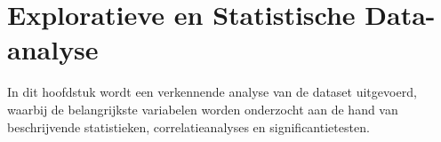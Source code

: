 \chapter{Exploratieve en Statistische Data-analyse}%
\label{ch:exploratieve-en-statistische-data-analyse}

In dit hoofdstuk wordt een verkennende analyse van de dataset uitgevoerd, waarbij de belangrijkste variabelen worden onderzocht aan de hand van beschrijvende statistieken, correlatieanalyses en significantietesten.